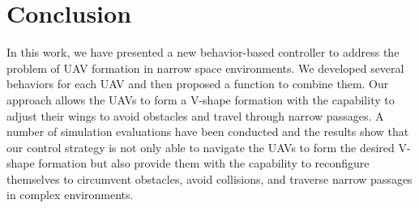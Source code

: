 \section{Conclusion} \label{sec:0conclusion}
In this work, we have presented a new behavior-based controller to address the problem of UAV formation in narrow space environments. We developed several behaviors for each UAV and then proposed a function to combine them. Our approach allows the UAVs to form a V-shape formation with the capability to adjust their wings to avoid obstacles and travel through narrow passages. A number of simulation evaluations have been conducted and the results show that our control strategy is not only able to navigate the UAVs to form the desired V-shape formation but also provide them with the capability to reconfigure themselves to circumvent obstacles, avoid collisions, and traverse narrow passages in complex environments.